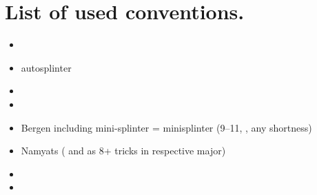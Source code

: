 \documentclass[12pt,a4paper,twoside]{article}
\begin{document}
  \section{List of used conventions.}
  \begin{itemize}
    \item  \pagebreak[2]
    \item autosplinter \pagebreak[2]
    \item  \pagebreak[2]
    \item  \pagebreak[2]
    \item Bergen including mini-splinter \newline \pagebreak[2]
       = minisplinter (9--11, , any shortness) \pagebreak[2]
    \item Namyats ( and  as 8+ tricks in respective major) \pagebreak[2]
    \item  \pagebreak[2]
    \item  \pagebreak[2]
  \end{itemize}

   \pagebreak[2]
   \pagebreak[2]
\end{document}
